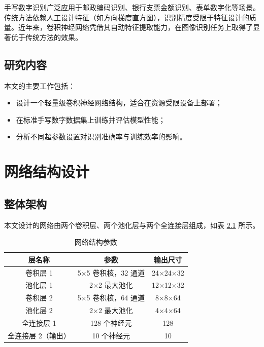 \documentclass[report,oneside,UTF8,zihao=-4]{config}
\begin{document}
手写数字识别广泛应用于邮政编码识别、银行支票金额识别、表单数字化等场景。传统方法依赖人工设计特征（如方向梯度直方图），识别精度受限于特征设计的质量。近年来，卷积神经网络凭借其自动特征提取能力，在图像识别任务上取得了显著优于传统方法的效果\cite{lecun1998}。

\section{研究内容}

本文的主要工作包括：

\begin{itemize}
    \item 设计一个轻量级卷积神经网络结构，适合在资源受限设备上部署；
    \item 在标准手写数字数据集上训练并评估模型性能；
    \item 分析不同超参数设置对识别准确率与训练效率的影响。
\end{itemize}

\chapter{网络结构设计}

\section{整体架构}

本文设计的网络由两个卷积层、两个池化层与两个全连接层组成，如表 \ref{tab:architecture} 所示。

\begin{table}
    \centering
    \renewcommand{\arraystretch}{1.3}
    \caption{网络结构参数}
    \label{tab:architecture}
    \begin{threeparttable}[c]
        \begin{tabular}{ccc}
            \toprule[1.5pt]
            \textbf{层名称} & \textbf{参数} & \textbf{输出尺寸}\\
            \midrule[0.8pt]
            卷积层 1 & 5×5 卷积核，32 通道 & 24×24×32\\
            池化层 1 & 2×2 最大池化 & 12×12×32\\
            卷积层 2 & 5×5 卷积核，64 通道 & 8×8×64\\
            池化层 2 & 2×2 最大池化 & 4×4×64\\
            全连接层 1 & 128 个神经元 & 128\\
            全连接层 2（输出） & 10 个神经元 & 10\\
            \bottomrule[1.5pt]
        \end{tabular}
    \end{threeparttable}
\end{table}
\end{document}
